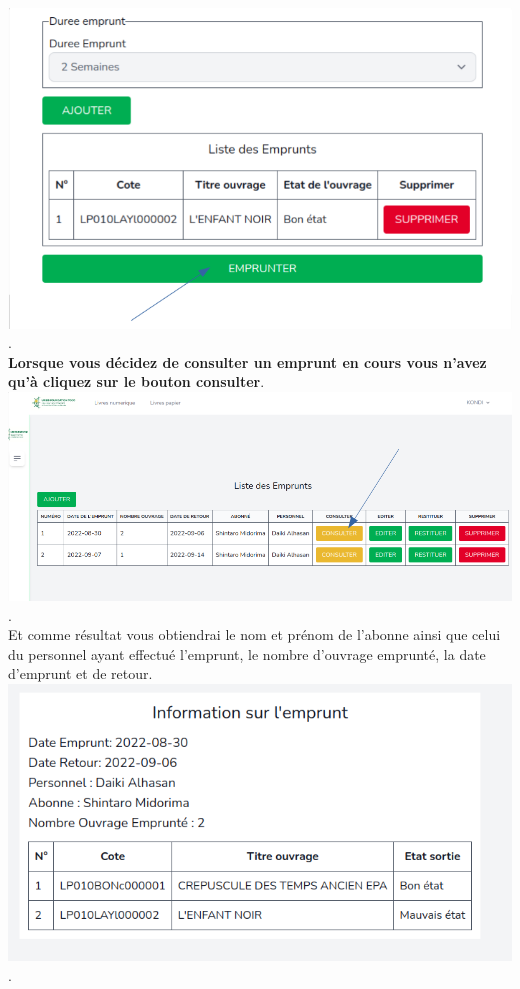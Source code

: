 \documentclass[12pt,a4paper]{article}
\begin{document}
\includegraphics[scale=0.5]{images/EDureeEmprunt.png}.\\

\textbf{Lorsque vous décidez de consulter un emprunt en cours vous n'avez qu'à cliquez sur le bouton consulter}.\\

\includegraphics[scale=0.5]{images/ConsultEmprunt.png}.\\

Et comme résultat vous obtiendrai le nom et prénom de l'abonne ainsi que celui du personnel ayant effectué l'emprunt, le nombre d'ouvrage emprunté, la date d'emprunt et de retour.\\

\includegraphics[scale=0.5]{images/ConsultationEmprunt.png}.\\
\end{document}
